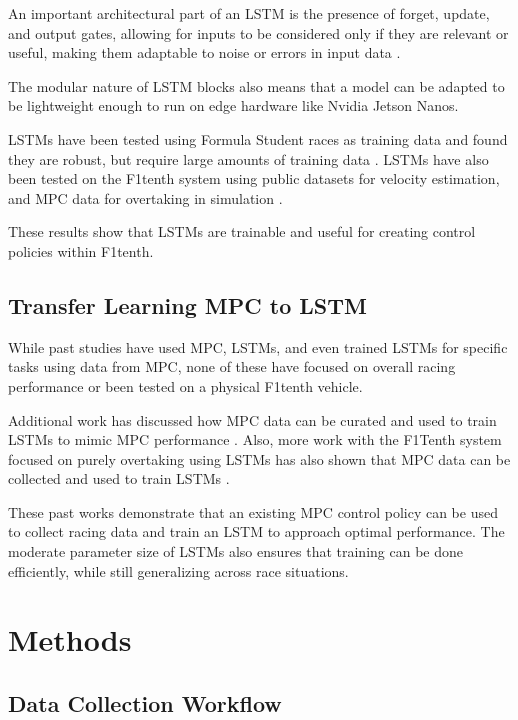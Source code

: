 \documentclass[conference]{IEEEtran}
\begin{document}
An important architectural part of an LSTM is the presence of forget, update, and output gates, allowing for inputs to be considered only if they are relevant or useful, making them adaptable to noise or errors in input data \cite{ai6090215}.

The modular nature of LSTM blocks also means that a model can be adapted to be lightweight enough to run on edge hardware like Nvidia Jetson Nanos. 

LSTMs have been tested using Formula Student races as training data and found they are robust, but require large amounts of training data \cite{srinivasan2020end}. LSTMs have also been tested on the F1tenth system using public datasets for velocity estimation, and MPC data for overtaking in simulation \cite{wegrzynowski2024learning,zhang2023f1tenth}. 

These results show that LSTMs are trainable and useful for creating control policies within F1tenth. 

\subsection{Transfer Learning MPC to LSTM}

While past studies have used MPC, LSTMs, and even trained LSTMs for specific tasks using data from MPC, none of these have focused on overall racing performance or been tested on a physical F1tenth vehicle. 

Additional work has discussed how MPC data can be curated and used to train LSTMs to mimic MPC performance \cite{munoz2023deep}. Also, more work with the F1Tenth system focused on purely overtaking using LSTMs has also shown that MPC data can be collected and used to train LSTMs \cite{zhang2023f1tenth}.

These past works demonstrate that an existing MPC control policy can be used to collect racing data and train an LSTM to approach optimal performance. The moderate parameter size of LSTMs also ensures that training can be done efficiently, while still generalizing across race situations. 

\section{Methods}

\subsection{Data Collection Workflow}
\end{document}
